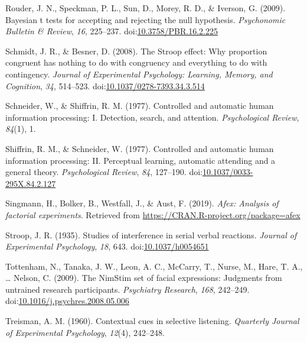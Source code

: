 \documentclass[english,,man,floatsintext]{apa6}
\begin{document}
\leavevmode\hypertarget{ref-rouder_bayesian_2009}{}%
Rouder, J. N., Speckman, P. L., Sun, D., Morey, R. D., \& Iverson, G. (2009). Bayesian t tests for accepting and rejecting the null hypothesis. \emph{Psychonomic Bulletin \& Review}, \emph{16}, 225--237. doi:\href{https://doi.org/10.3758/PBR.16.2.225}{10.3758/PBR.16.2.225}

\leavevmode\hypertarget{ref-schmidt_stroop_2008}{}%
Schmidt, J. R., \& Besner, D. (2008). The Stroop effect: Why proportion congruent has nothing to do with congruency and everything to do with contingency. \emph{Journal of Experimental Psychology: Learning, Memory, and Cognition}, \emph{34}, 514--523. doi:\href{https://doi.org/10.1037/0278-7393.34.3.514}{10.1037/0278-7393.34.3.514}

\leavevmode\hypertarget{ref-schneider_controlled_1977}{}%
Schneider, W., \& Shiffrin, R. M. (1977). Controlled and automatic human information processing: I. Detection, search, and attention. \emph{Psychological Review}, \emph{84}(1), 1.

\leavevmode\hypertarget{ref-shiffrin_controlled_1977}{}%
Shiffrin, R. M., \& Schneider, W. (1977). Controlled and automatic human information processing: II. Perceptual learning, automatic attending and a general theory. \emph{Psychological Review}, \emph{84}, 127--190. doi:\href{https://doi.org/10.1037/0033-295X.84.2.127}{10.1037/0033-295X.84.2.127}

\leavevmode\hypertarget{ref-r_afex_2019}{}%
Singmann, H., Bolker, B., Westfall, J., \& Aust, F. (2019). \emph{Afex: Analysis of factorial experiments}. Retrieved from \url{https://CRAN.R-project.org/package=afex}

\leavevmode\hypertarget{ref-stroop_studies_1935}{}%
Stroop, J. R. (1935). Studies of interference in serial verbal reactions. \emph{Journal of Experimental Psychology}, \emph{18}, 643. doi:\href{https://doi.org/10.1037/h0054651}{10.1037/h0054651}

\leavevmode\hypertarget{ref-tottenham_nimstim_2009}{}%
Tottenham, N., Tanaka, J. W., Leon, A. C., McCarry, T., Nurse, M., Hare, T. A., \ldots{} Nelson, C. (2009). The NimStim set of facial expressions: Judgments from untrained research participants. \emph{Psychiatry Research}, \emph{168}, 242--249. doi:\href{https://doi.org/10.1016/j.psychres.2008.05.006}{10.1016/j.psychres.2008.05.006}

\leavevmode\hypertarget{ref-treisman_contextual_1960}{}%
Treisman, A. M. (1960). Contextual cues in selective listening. \emph{Quarterly Journal of Experimental Psychology}, \emph{12}(4), 242--248.
\end{document}
